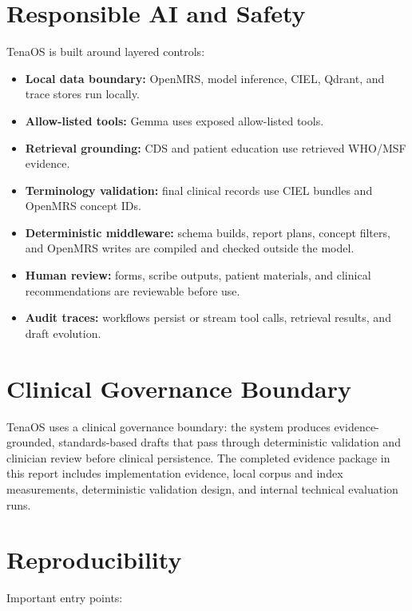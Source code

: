 \documentclass[11pt]{article}
\newcommand{\Product}{TenaOS}
\newcommand{\OpenMRS}{OpenMRS}
\newcommand{\CIEL}{CIEL}
\newcommand{\WHO}{WHO/MSF}
\begin{document}
\section{Responsible AI and Safety}

\Product{} is built around layered controls:

\begin{itemize}
  \item \textbf{Local data boundary:} \OpenMRS{}, model inference, \CIEL{}, Qdrant, and trace stores run locally.
  \item \textbf{Allow-listed tools:} Gemma uses exposed allow-listed tools.
  \item \textbf{Retrieval grounding:} CDS and patient education use retrieved \WHO{} evidence.
  \item \textbf{Terminology validation:} final clinical records use \CIEL{} bundles and \OpenMRS{} concept IDs.
  \item \textbf{Deterministic middleware:} schema builds, report plans, concept filters, and \OpenMRS{} writes are compiled and checked outside the model.
  \item \textbf{Human review:} forms, scribe outputs, patient materials, and clinical recommendations are reviewable before use.
  \item \textbf{Audit traces:} workflows persist or stream tool calls, retrieval results, and draft evolution.
\end{itemize}

\section{Clinical Governance Boundary}

\Product{} uses a clinical governance boundary: the system produces evidence-grounded, standards-based drafts that pass through deterministic validation and clinician review before clinical persistence. The completed evidence package in this report includes implementation evidence, local corpus and index measurements, deterministic validation design, and internal technical evaluation runs.

\section{Reproducibility}

Important entry points:
\end{document}

